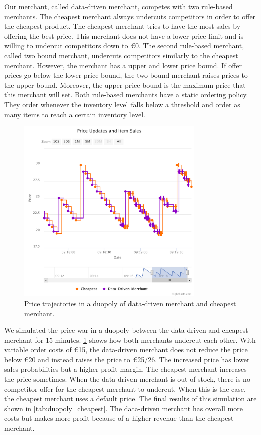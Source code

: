Our merchant, called data-driven merchant, competes with two rule-based merchants.
The cheapest merchant always undercuts competitors in order to offer the cheapest product.
The cheapest merchant tries to have the most sales by offering the best price.
This merchant does not have a lower price limit and is willing to undercut competitors down to €0.
The second rule-based merchant, called two bound merchant, undercuts competitors similarly to the cheapest merchant.
However, the merchant has a upper and lower price bound.
If offer prices go below the lower price bound, the two bound merchant raises prices to the upper bound.
Moreover, the upper price bound is the maximum price that this merchant will set.
Both rule-based merchants have a static ordering policy.
They order whenever the inventory level falls below a threshold and order as many items to reach a certain inventory level.


\begin{figure}[t]
	\centering
	\includegraphics[width=0.8\textwidth]{figures/duopoly_cheapest_prices}
	\caption{Price trajectories in a duopoly of data-driven merchant and cheapest merchant.}
	\label{fig:duopoly_cheapest}
\end{figure}

We simulated the price war in a duopoly between the data-driven and cheapest merchant for 15 minutes.
\cref{fig:duopoly_cheapest} shows how both merchants undercut each other.
With variable order costs of €15, the data-driven merchant does not reduce the price below €20 and instead raises the price to €25/26.
The increased price has lower sales probabilities but a higher profit margin.
The cheapest merchant increases the price sometimes.
When the data-driven merchant is out of stock, there is no competitor offer for the cheapest merchant to undercut.
When this is the case, the cheapest merchant uses a default price.
The final results of this simulation are shown in \cref{tab:duopoly_cheapest}.
The data-driven merchant has overall more costs but makes more profit because of a higher revenue than the cheapest merchant.

